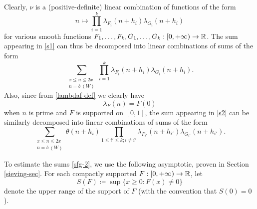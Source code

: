 Clearly, $\nu$ is a (positive-definite) linear combination of functions of the form
$$ n \mapsto \prod_{i=1}^k \lambda_{F_i}(n+h_i) \lambda_{G_i}(n+h_i)$$
for various smooth functions $F_1,\dots,F_k,G_1,\dots,G_k: [0,+\infty) \to \mathbb{R}$.  The sum appearing in \eqref{s1} can thus be decomposed into linear combinations of sums of the form
\begin{equation}\label{sfg-1}
 \sum_{\substack{x \leq n \leq 2x\\ n = b\ (W)}} \prod_{i=1}^k \lambda_{F_i}(n+h_i) \lambda_{G_i}(n+h_i).
\end{equation}
Also, since from \eqref{lambdaf-def} we clearly have
\begin{equation}\label{lambdan-prime}
\lambda_F(n) = F(0)
\end{equation}
when $n$ is prime and $F$ is supported on $[0,1]$, the sum appearing in \eqref{s2} can be similarly decomposed into linear combinations of sums of the form
\begin{equation}\label{sfg-2}
 \sum_{\substack{x \leq n \leq 2x\\ n = b\ (W)}} \theta(n+h_i) \prod_{1 \leq i' \leq k; i \neq i'} \lambda_{F_{i'}}(n+h_{i'}) \lambda_{G_{i'}}(n+h_{i'}).
\end{equation}

To estimate the sums \eqref{sfg-2}, we use the following asymptotic, proven in Section \ref{sieving-sec}.  For each compactly supported $F: [0,+\infty) \to \mathbb{R}$, let
\begin{equation}\label{S-def}
S(F) \coloneqq \sup \{ x \geq 0: F(x) \neq 0\}
\end{equation}
 denote the upper range of the support of $F$ (with the convention that $S(0)=0$).

